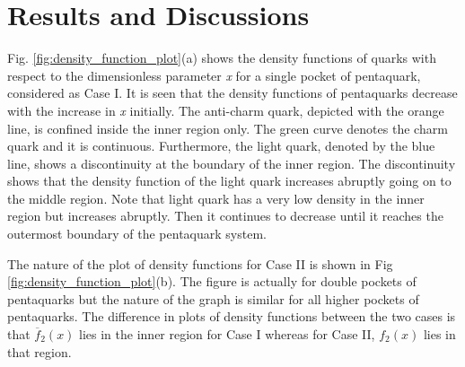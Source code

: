 \documentclass[final,3p,times,twocolumn]{elsarticle}
\begin{document}
        
\section{Results and Discussions}
    Fig. \ref{fig:density_function_plot}(a) shows the density functions of quarks with respect to the dimensionless parameter \textit{x} for a single pocket of pentaquark, considered as Case I. It is seen that the density functions of pentaquarks decrease with the increase in \textit{x} initially. The anti-charm quark, depicted with the orange line, is confined inside the inner region only. The green curve denotes the charm quark and it is continuous. Furthermore, the light quark, denoted by the blue line, shows a discontinuity at the boundary of the inner region. The discontinuity shows that the density function of the light quark increases abruptly going on to the middle region. Note that light quark has a very low density in the inner region but increases abruptly. Then it continues to decrease until it reaches the outermost boundary of the pentaquark system.      
        
    The nature of the plot of density functions for Case II is shown in Fig \ref{fig:density_function_plot}(b).  The figure is actually for double pockets of pentaquarks but the nature of the graph is similar for all higher pockets of pentaquarks. The difference in plots of density functions between the two cases is that $\overline{f}_{2}(x)$ lies in the inner region for Case I whereas for Case II, $f_{2}(x)$ lies in that region.    
\end{document}
